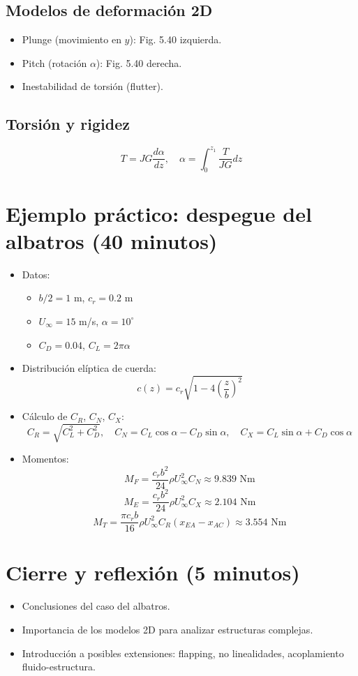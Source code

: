 \documentclass[12pt]{article}
\begin{document}
\subsection{Modelos de deformación 2D}
\begin{itemize}
    \item Plunge (movimiento en $y$): Fig. 5.40 izquierda.
    \item Pitch (rotación $\alpha$): Fig. 5.40 derecha.
    \item Inestabilidad de torsión (flutter).
\end{itemize}

\subsection{Torsión y rigidez}
\[
T = JG \frac{d\alpha}{dz}, \quad \alpha = \int_0^{z_1} \frac{T}{JG} dz
\]

\section{Ejemplo práctico: despegue del albatros (40 minutos)}
\begin{itemize}
    \item Datos:
    \begin{itemize}
        \item $b/2 = 1$ m, $c_r = 0.2$ m
        \item $U_\infty = 15$ m/s, $\alpha = 10^\circ$
        \item $C_D = 0.04$, $C_L = 2\pi\alpha$
    \end{itemize}
    \item Distribución elíptica de cuerda:
    \[
    c(z) = c_r \sqrt{1 - 4 \left( \frac{z}{b} \right)^2 }
    \]
    \item Cálculo de $C_R$, $C_N$, $C_X$:
    \[
    C_R = \sqrt{C_L^2 + C_D^2}, \quad C_N = C_L \cos\alpha - C_D \sin\alpha, \quad C_X = C_L \sin\alpha + C_D \cos\alpha
    \]
    \item Momentos:
    \[
    M_F = \frac{c_r b^2}{24} \rho U_\infty^2 C_N \approx 9.839 \text{ Nm}
    \]
    \[
    M_E = \frac{c_r b^2}{24} \rho U_\infty^2 C_X \approx 2.104 \text{ Nm}
    \]
    \[
    M_T = \frac{\pi c_r b}{16} \rho U_\infty^2 C_R (x_{EA} - x_{AC}) \approx 3.554 \text{ Nm}
    \]
\end{itemize}

\section{Cierre y reflexión (5 minutos)}
\begin{itemize}
    \item Conclusiones del caso del albatros.
    \item Importancia de los modelos 2D para analizar estructuras complejas.
    \item Introducción a posibles extensiones: flapping, no linealidades, acoplamiento fluido-estructura.
\end{itemize}
\end{document}
